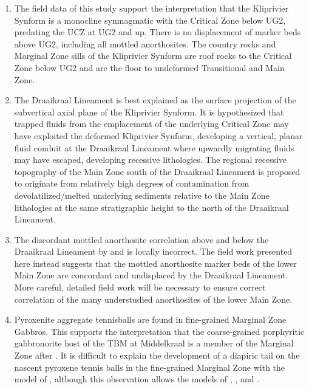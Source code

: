 \begin{enumerate}
\def\labelenumi{\arabic{enumi})}
\item
  The field data of this study support the interpretation that the
  Kliprivier Synform is a monocline synmagmatic with the Critical Zone
  below UG2, predating the UCZ at UG2 and up. There is no displacement
  of marker beds above UG2, including all mottled anorthosites. The
  country rocks and Marginal Zone sills of the Kliprivier Synform are
  roof rocks to the Critical Zone below UG2 and are the floor to
  undeformed Transitional and Main Zone.
\item
  The Draaikraal Lineament is best explained as the surface projection
  of the subvertical axial plane of the Kliprivier Synform. It is
  hypothesized that trapped fluids from the emplacement of the
  underlying Critical Zone may have exploited the deformed Kliprivier
  Synform, developing a vertical, planar fluid conduit at the
  Draaikraal Lineament where upwardly migrating fluids may have escaped,
  developing recessive lithologies. The regional recessive topography of
  the Main Zone south of the Draaikraal Lineament is proposed to
  originate from relatively high degrees of contamination from
  devolatilized/melted underlying sediments relative to the Main Zone
  lithologies at the same stratigraphic height to the north of the
  Draaikraal Lineament.
\item
  The discordant mottled anorthosite correlation above and below the
  Draaikraal Lineament by \citet{vandermerwe2007} and \citet{latypovetal2022}
  is locally incorrect. The field work presented here instead suggests
  that the mottled anorthosite marker beds of the lower Main Zone are
  concordant and undisplaced by the Draaikraal Lineament. More careful,
  detailed field work will be necessary to ensure correct correlation of
  the many understudied anorthosites of the lower Main Zone.
\item
  Pyroxenite aggregate tennisballs are found in fine-grained Marginal
  Zone Gabbros. This supports the interpretation that the coarse-grained
  porphyritic gabbronorite host of the TBM at Middelkraal is a member of
  the Marginal Zone after \citet{mitchell2023}. It is difficult to
  explain the development of a diapiric tail on the nascent pyroxene
  tennis balls in the fine-grained Marginal Zone with the model of
  \citet{khoza2021}, although this observation allows the models of
  \citet{mitchell2023}, \citet{smith2023}, and \citet{lee1979}.
\end{enumerate}

